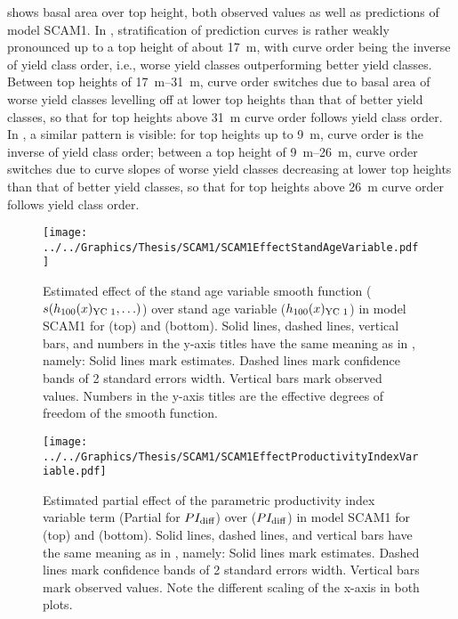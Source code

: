 shows basal area over top height, both observed values as well as predictions of model SCAM1.  In \Beech{}, stratification of prediction curves is rather weakly pronounced up to a top height of about \SI{17}{\meter}, with curve order being the inverse of yield class order, i.e., worse yield classes outperforming better yield classes.  Between top heights of \SIrange{17}{31}{\meter}, curve order switches due to basal area of worse yield classes levelling off at lower top heights than that of better yield classes, so that for top heights above \SI{31}{\meter} curve order follows yield class order.  In \Spruce{}, a similar pattern is visible:  for top heights up to \SI{9}{\meter}, curve order is the inverse of yield class order;  between a top height of \SIrange{9}{26}{\meter}, curve order switches due to curve slopes of worse yield classes decreasing at lower top heights than that of better yield classes, so that for top heights above \SI{26}{\meter} curve order follows yield class order.

\begin{figure}[h]
  \centering
  \texttt{[image: ../../Graphics/Thesis/SCAM1/SCAM1EffectStandAgeVariable.pdf]}
  \caption{Estimated effect of the stand age variable smooth function (\(s(h_{100}(x)_{\text{YC 1}}{}, \ldots)\)) over stand age variable (\(h_{100}(x)_{\text{YC 1}}{}\)) in model SCAM1 for \Beech{} (top) and \Spruce{} (bottom).   Solid lines, dashed lines, vertical bars, and numbers in the y-axis titles have the same meaning as in , namely:  Solid lines mark estimates.  Dashed lines mark confidence bands of 2 standard errors width.  Vertical bars mark observed values.  Numbers in the y-axis titles are the effective degrees of freedom of the smooth function.}
  \label{fig:SCAM1EffectStandAgeVariable}
\end{figure}

\begin{figure}[h]
  \centering
  \texttt{[image: ../../Graphics/Thesis/SCAM1/SCAM1EffectProductivityIndexVariable.pdf]}
  \caption{Estimated partial effect of the parametric productivity index variable term (Partial for \(PI_{\text{diff}}{}\)) over \ProductivityIndexVariableText{} (\(PI_{\text{diff}}{}\)) in model SCAM1 for \Beech{} (top) and \Spruce{} (bottom).   Solid lines, dashed lines, and vertical bars have the same meaning as in , namely:  Solid lines mark estimates.  Dashed lines mark confidence bands of 2 standard errors width.  Vertical bars mark observed values.  Note the different scaling of the x-axis in both plots.}
  \label{fig:SCAM1EffectProductivityIndexVariable}
\end{figure}

